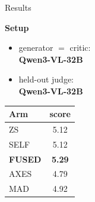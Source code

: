 \documentclass[aspectratio=169,10pt]{beamer}
\begin{document}
\begin{frame}{Results}
    \vspace{0.9cm}
    \begin{center}
    \begin{minipage}[t]{0.34\textwidth}
        \vspace{0pt}
        \textbf{Setup}
        \small
        \begin{itemize}
            \setlength{\itemsep}{0.1cm}
            \item generator $=$ critic: \\ \textbf{Qwen3-VL-32B}
            \item held-out judge: \\ \textbf{Qwen3-VL-32B}
        \end{itemize}

        \vspace{0.15cm}
    \end{minipage}%
    \hspace{1.4cm}%
    \begin{minipage}[t]{0.26\textwidth}
        \vspace{0pt}
        \centering
        \begin{tabular}{@{}lc@{}}
            \toprule
            \textbf{Arm} & \textbf{score} \\
            \midrule
            ZS    & 5.12 \\
            SELF  & 5.12 \\
            \textbf{FUSED} & \color{winner}\textbf{5.29} \\
            AXES  & 4.79 \\
            MAD   & 4.92 \\
            \bottomrule
        \end{tabular}
    \end{minipage}
    \end{center}
\end{frame}
\end{document}
